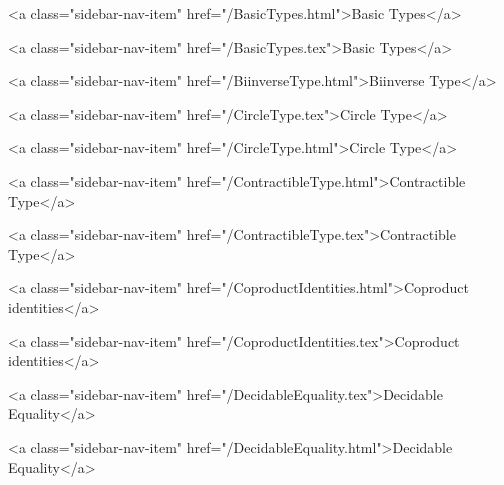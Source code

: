           <a class="sidebar-nav-item" href="/BasicTypes.html">Basic Types</a>
        
      
    
      
        
          <a class="sidebar-nav-item" href="/BasicTypes.tex">Basic Types</a>
        
      
    
      
        
          <a class="sidebar-nav-item" href="/BiinverseType.html">Biinverse Type</a>
        
      
    
      
        
          <a class="sidebar-nav-item" href="/CircleType.tex">Circle Type</a>
        
      
    
      
        
          <a class="sidebar-nav-item" href="/CircleType.html">Circle Type</a>
        
      
    
      
        
          <a class="sidebar-nav-item" href="/ContractibleType.html">Contractible Type</a>
        
      
    
      
        
          <a class="sidebar-nav-item" href="/ContractibleType.tex">Contractible Type</a>
        
      
    
      
        
          <a class="sidebar-nav-item" href="/CoproductIdentities.html">Coproduct identities</a>
        
      
    
      
        
          <a class="sidebar-nav-item" href="/CoproductIdentities.tex">Coproduct identities</a>
        
      
    
      
        
          <a class="sidebar-nav-item" href="/DecidableEquality.tex">Decidable Equality</a>
        
      
    
      
        
          <a class="sidebar-nav-item" href="/DecidableEquality.html">Decidable Equality</a>
        
      
    

